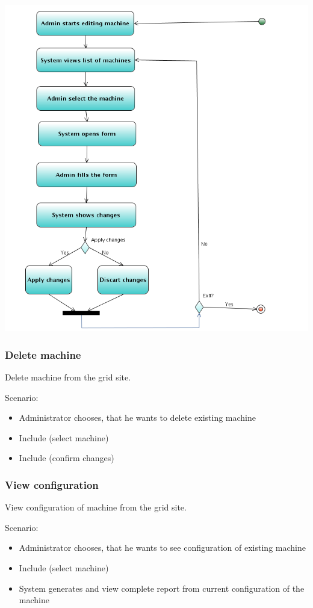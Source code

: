 \documentclass{article}
\begin{document}
\includegraphics[width=\linewidth]{EditM.png}


\subsubsection{Delete machine}
Delete machine from the grid site.

Scenario:
\begin{itemize}
\item{Administrator chooses, that he wants to delete existing machine}
\item{Include (select machine)}
\item{Include (confirm changes)}
\end{itemize}

\subsubsection{View configuration}
View configuration of machine from the grid site.

Scenario:
\begin{itemize}
\item{Administrator chooses, that he wants to see configuration of existing machine}
\item{Include (select machine)}
\item{System generates and view complete report from current configuration of the machine}
\end{itemize}
\end{document}
